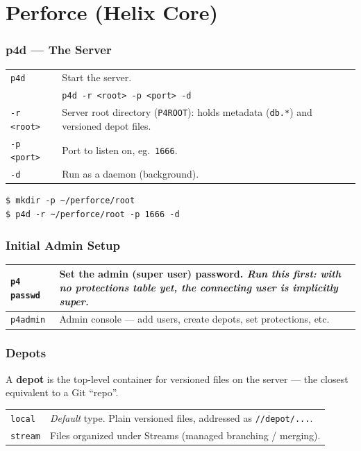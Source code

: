 \section{Perforce (Helix Core)}

\subsubsection*{p4d --- The Server}

\begin{tabularx}{\linewidth}{lX}
    \texttt{p4d}        & Start the server.\\
                        & \texttt{p4d -r <root> -p <port> -d}\\
    \texttt{-r <root>}  & Server root directory (\texttt{P4ROOT}):
                            holds metadata (\texttt{db.*}) and
                            versioned depot files.\\
    \texttt{-p <port>}  & Port to listen on, eg.\ \texttt{1666}.\\
    \texttt{-d}         & Run as a daemon (background).\\
\hline
\end{tabularx}

\begin{mdframed}[backgroundcolor=gray!10,linecolor=Firebrick4]
\begin{verbatim}
$ mkdir -p ~/perforce/root
$ p4d -r ~/perforce/root -p 1666 -d
\end{verbatim}
\end{mdframed}


\subsubsection*{Initial Admin Setup}

\begin{tabularx}{\linewidth}{lX}
    \texttt{p4 passwd}  & Set the admin (super user) password.
                            \textit{Run this first: with no
                            protections table yet, the connecting
                            user is implicitly super.}\\
\hline
    \texttt{p4admin}    & Admin console --- add users, create
                            depots, set protections, etc.\\
\hline
\end{tabularx}


\subsubsection*{Depots}

A \textbf{depot} is the top-level container for versioned files on
the server --- the closest equivalent to a Git ``repo''.

\begin{tabularx}{\linewidth}{lX}
    \texttt{local}  & \textit{Default} type. Plain versioned files,
                        addressed as \texttt{//depot/...}.\\
    \texttt{stream} & Files organized under Streams (managed
                        branching / merging).\\
\hline
\end{tabularx}
